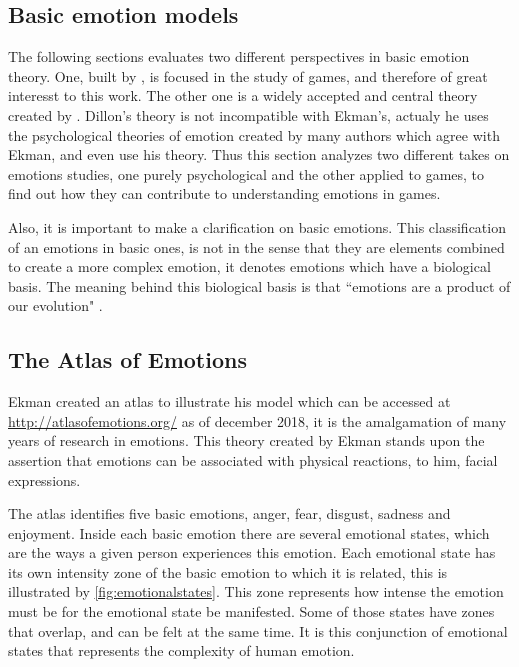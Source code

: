 \subsection{Basic emotion models}

The following sections evaluates two different perspectives in basic emotion theory. One, built by \cite{dillon_way_2010}, is focused in the study of games, and therefore of great interesst to this work. The other one is a widely accepted and central theory created by \cite{ekman_are_basic_emotions_nodate}. Dillon's theory is not incompatible with Ekman's, actualy he uses the psychological theories of emotion created by many authors which agree with Ekman, and even use his theory. Thus this section analyzes two different takes on emotions studies, one purely psychological and the other applied to games, to find out how they can contribute to understanding emotions in games.

Also, it is important to make a clarification on basic emotions. This classification of an emotions in basic ones, is not in the sense that they are elements combined to create a more complex emotion, it denotes emotions which have a biological basis. The meaning behind this biological basis is that ``emotions are a product of our evolution" \cite{ekman_are_basic_emotions_nodate}. 

\subsection{The Atlas of Emotions}

Ekman created an atlas to illustrate his model which can be accessed at \url{http://atlasofemotions.org/} as of december 2018, it is the amalgamation of many years of research in emotions. This theory created by Ekman stands upon the assertion that emotions can be associated with physical reactions, to him, facial expressions.

The atlas identifies five basic emotions, anger, fear, disgust, sadness and enjoyment. Inside each basic emotion there are several emotional states, which are the ways a given person experiences this emotion. Each emotional state has its own intensity zone of the basic emotion to which it is related, this is illustrated by \autoref{fig:emotionalstates}. This zone represents how intense the emotion must be for the emotional state be manifested. Some of those states have zones that overlap, and can be felt at the same time. It is this conjunction of emotional states that represents the complexity of human emotion.

